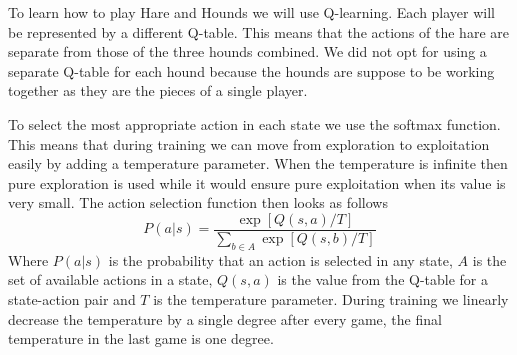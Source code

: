 To learn how to play Hare and Hounds we will use Q-learning\cite{watkins1992q}.
Each player will be represented by a different Q-table. This means that the
actions of the hare are separate from those of the three hounds combined. We
did not opt for using a separate Q-table for each hound because the hounds are
suppose to be working together as they are the pieces of a single player.

To select the most appropriate action in each state we use the softmax
function. This means that during training we can move from exploration to
exploitation easily by adding a temperature parameter. When the temperature
is infinite then pure exploration is used while it would ensure pure
exploitation when its value is very small. The action selection function then
looks as follows
\[ P(a|s) = \frac{\exp[Q(s,a)/T]}{\sum_{b \in A} \exp[Q(s, b)/T]} \]
Where $P(a|s)$ is the probability that an action is selected in any state, $A$
is the set of available actions in a state, $Q(s,a)$ is the value from the
Q-table for a state-action pair and $T$ is the temperature parameter. During
training we linearly decrease the temperature by a single degree after every
game, the final temperature in the last game is one degree.